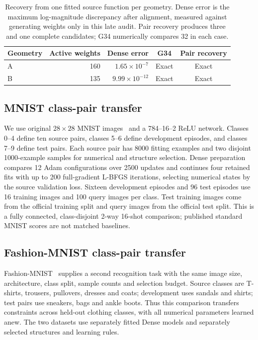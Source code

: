 \begin{table}[htbp]
    \centering\small
    \begin{tabular}{lrrcc}
        \toprule
        Geometry & Active weights & Dense error & G34 & Pair recovery\\
        \midrule
        A & 160 & $1.65\times10^{-7}$ & Exact & Exact\\
        B & 135 & $9.99\times10^{-12}$ & Exact & Exact\\
        \bottomrule
    \end{tabular}
    \caption{Recovery from one fitted source function per geometry.
        Dense error is the maximum log-magnitude discrepancy after
        alignment, measured against generating weights only in this
        late audit. Pair recovery produces three and one complete
        candidates; G34 numerically compares 32 in each case.}
    \label{tab:recovery-synthetic}
\end{table}

\FloatBarrier
\subsection{MNIST class-pair transfer}

We use original $28\times28$ MNIST images~\cite{lecun1998gradient}
and a 784--16--2 ReLU network. Classes 0--4 define ten source pairs,
classes 5--6 define development episodes, and classes 7--9 define test
pairs. Each source pair has 8000 fitting examples and two disjoint
1000-example samples for numerical and structure selection. Dense
preparation compares 12 Adam configurations over 2500 updates and
continues four retained fits with up to 200 full-gradient L-BFGS iterations,
selecting numerical states by the source validation loss.
Sixteen development episodes and 96 test episodes use 16 training
images and 100 query images per class. Test training images come
from the official training split and query images from the official
test split. This is a fully connected, class-disjoint 2-way 16-shot
comparison; published standard MNIST scores are not matched baselines.


\FloatBarrier
\subsection{Fashion-MNIST class-pair transfer}

Fashion-MNIST~\cite{xiao2017fashion} supplies a second recognition task
with the same image size, architecture, class split, sample counts and
selection budget. Source classes are T-shirts, trousers, pullovers,
dresses and coats; development uses sandals and shirts; test pairs
use sneakers, bags and ankle boots. Thus this comparison transfers
constraints across held-out clothing classes, with all numerical
parameters learned anew. The two datasets use separately fitted
Dense models and separately selected structures and learning rules.

